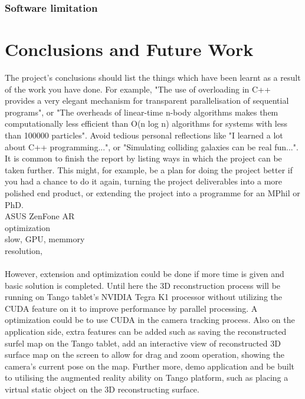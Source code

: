 \documentclass[12pt,twoside]{article}
\begin{document}
\subsubsection{Software limitation}






\newpage







\section{Conclusions and Future Work}

The project's conclusions should list the things which have been learnt as a result of the work you have done. For example, "The use of overloading in C++ provides a very elegant mechanism for transparent parallelisation of sequential programs", or "The overheads of linear-time n-body algorithms makes them computationally less efficient than O(n log n) algorithms for systems with less than 100000 particles". Avoid tedious personal reflections like "I learned a lot about C++ programming...", or "Simulating colliding galaxies can be real fun...". It is common to finish the report by listing ways in which the project can be taken further. This might, for example, be a plan for doing the project better if you had a chance to do it again, turning the project deliverables into a more polished end product, or extending the project into a programme for an MPhil or PhD.\\

ASUS ZenFone AR\\

optimization \\
slow, GPU, memmory\\
resolution, \\
\\
However, extension and optimization could be done if more time is given and basic solution is completed. Until here the 3D reconstruction process will be running on Tango tablet's NVIDIA Tegra K1 processor without utilizing the CUDA feature on it to improve performance by parallel processing. A optimization could be to use CUDA in the camera tracking process. Also on the application side, extra features can be added such as saving the reconstructed surfel map on the Tango tablet, add an interactive view of reconstructed 3D surface map on the screen to allow for drag and zoom operation, showing the camera's current pose on the map. Further more, demo application and be built to utilising the augmented reality ability on Tango platform, such as placing a virtual static object on the 3D reconstructing surface.\\
\end{document}
